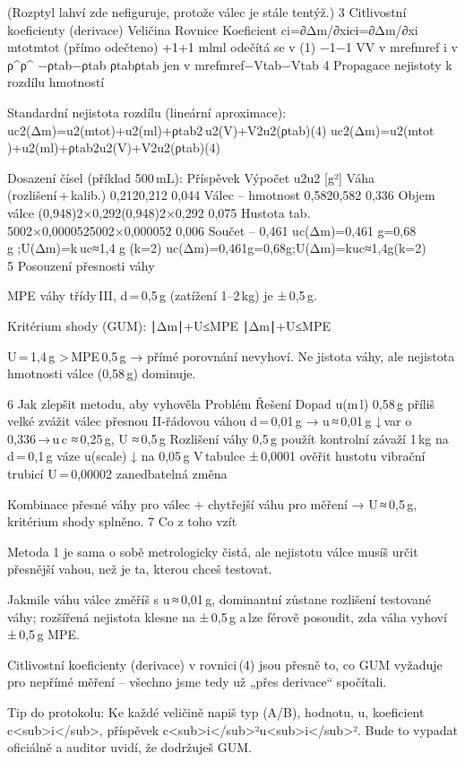 {(Rozptyl lahví zde nefiguruje, protože válec je stále tentýž.)
3  Citlivostní koeficienty (derivace)
Veličina	Rovnice	Koeficient ci=∂Δm/∂xici​=∂Δm/∂xi​
mtotmtot​	(přímo odečteno)	+1+1
mlml​	odečítá se v (1)	−1−1
VV	v mrefmref​ i v ρ^ρ^​	−ρtab−ρtab​
ρtabρtab​	jen v mrefmref​	−Vtab−Vtab​
4  Propagace nejistoty k rozdílu hmotností

Standardní nejistota rozdílu (lineární aproximace):
uc2(Δm)=u2(mtot)+u2(ml)+ρtab2 u2(V)+V2u2(ρtab)(4)
uc2​(Δm)=u2(mtot​)+u2(ml​)+ρtab2​u2(V)+V2u2(ρtab​)(4)

Dosazení čísel (příklad 500 mL):
Příspěvek	Výpočet	u2u2 [g²]
Váha (rozlišení + kalib.)	0,2120,212	0,044
Válec – hmotnost	0,5820,582	0,336
Objem válce	(0,948)2×0,292(0,948)2×0,292	0,075
Hustota tab.	5002×0,0000525002×0,000052	0,006
Součet	–	0,461
uc(Δm)=0,461  g=0,68  g  ;U(Δm)=k uc≈1,4  g  (k=2)
uc​(Δm)=0,461
​g=0,68g;U(Δm)=kuc​≈1,4g(k=2)​
5  Posouzení přesnosti váhy

    MPE váhy třídy III, d = 0,5 g (zatížení 1–2 kg) je ± 0,5 g.

    Kritérium shody (GUM):
    ∣Δm∣+U≤MPE
    ∣Δm∣+U≤MPE

    U = 1,4 g > MPE 0,5 g → přímé porovnání nevyhoví.
    Ne jistota váhy, ale nejistota hmotnosti válce (0,58 g) dominuje.

6  Jak zlepšit metodu, aby vyhověla
Problém	Řešení	Dopad
u(m l) 0,58 g příliš velké	zvážit válec přesnou II‑řádovou váhou d = 0,01 g → u ≈ 0,01 g	↓ var o 0,336 → u c ≈ 0,25 g, U ≈ 0,5 g
Rozlišení váhy 0,5 g	použít kontrolní závaží 1 kg na d = 0,1 g váze	u(scale) ↓ na 0,05 g
V tabulce ± 0,0001	ověřit hustotu vibrační trubicí U = 0,00002	zanedbatelná změna

Kombinace přesné váhy pro válec + chytřejší váhu pro měření → U ≈ 0,5 g, kritérium shody splněno.
7  Co z toho vzít

    Metoda 1 je sama o sobě metrologicky čistá, ale
    nejistotu válce musíš určit přesnější vahou, než je ta, kterou chceš testovat.

    Jakmile váhu válce změříš s u ≈ 0,01 g, dominantní zůstane rozlišení testované váhy; rozšířená nejistota klesne na ± 0,5 g a lze férově posoudit, zda váha vyhoví ± 0,5 g MPE.

    Citlivostní koeficienty (derivace) v rovnici (4) jsou přesně to, co GUM vyžaduje pro nepřímé měření – všechno jsme tedy už „přes derivace“ spočítali.

    Tip do protokolu: Ke každé veličině napiš typ (A/B), hodnotu, u, koeficient c<sub>i</sub>, příspěvek c<sub>i</sub>²u<sub>i</sub>². Bude to vypadat oficiálně a auditor uvidí, že dodržuješ GUM.

}
